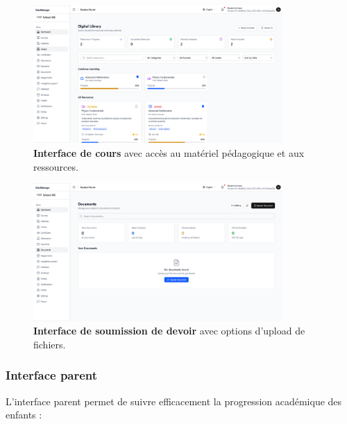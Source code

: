 \begin{figure}[H]
  \centering
  \includegraphics[width=0.85\textwidth,keepaspectratio]{pfe-pics/student/Screenshot 2025-06-09 at 22-45-09 Vite React TS.png}
  \caption{\textbf{Interface de cours} avec accès au matériel pédagogique et aux ressources.}
  \label{fig:course_view}
\end{figure}

\begin{figure}[H]
  \centering
  \includegraphics[width=0.85\textwidth,keepaspectratio]{pfe-pics/student/Screenshot 2025-06-09 at 22-46-22 Vite React TS.png}
  \caption{\textbf{Interface de soumission de devoir} avec options d'upload de fichiers.}
  \label{fig:assignment_submission}
\end{figure}

\subsubsection{Interface parent}

L'interface parent permet de suivre efficacement la progression académique des enfants :

